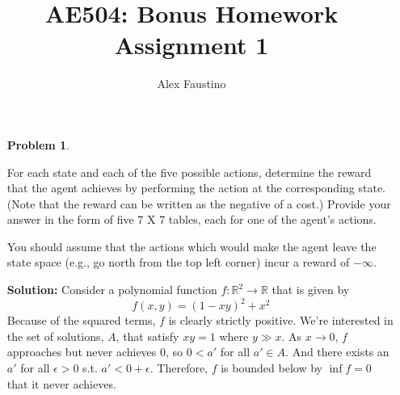 \documentclass[12pt,letterpaper]{article}
\title{AE504: Bonus Homework Assignment 1}
\author{Alex Faustino}
\begin{document}
\maketitle
\thispagestyle{empty}

\begin{enumerate}
    \item[\textbf{Problem 1}.] {
    For each state and each of the five possible actions, determine the reward that the agent achieves by performing the action at the corresponding state. (Note that the reward can be written as the negative of a cost.) Provide your answer in the form of five 7 X 7 tables, each for one of the agent’s actions.

    You should assume that the actions which would make the agent leave the state space (e.g., go north from the top left corner) incur a reward of $-\infty$.
    }
    \item[\textbf{Solution:}] {
    Consider a polynomial function $f:\mathbb{R}^2\to\mathbb{R}$ that is given by \begin{equation*}
        f(x,y)=(1-xy)^2+x^2
    \end{equation*}
    Because of the squared terms, $f$ is clearly strictly positive. We're interested in the set of solutions, $A$, that satisfy $xy=1$ where $y \gg x$. As $x\to0$, $f$ approaches but never achieves $0$, so $0<a'$ for all $a'\in A$. And there exists an $a'$ for all $\epsilon > 0$ s.t. $a'< 0 + \epsilon$. Therefore, $f$ is bounded below by $\inf f = 0$ that it never achieves.
    }
    

\end{enumerate}
\end{document}
